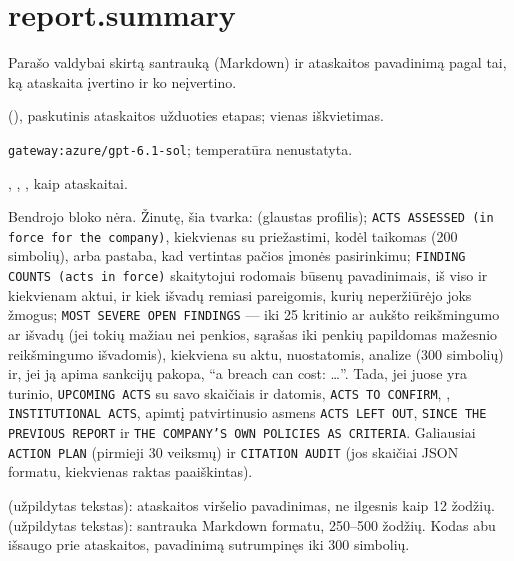 \section{report.summary}\label{sec:aprompts:report-summary}

 Parašo valdybai skirtą santrauką (Markdown) ir ataskaitos pavadinimą
pagal tai, ką ataskaita įvertino ir ko neįvertino.

  (), paskutinis
ataskaitos užduoties etapas; vienas iškvietimas.

 \texttt{gateway:azure/gpt-6.1-sol}; temperatūra
nenustatyta.

 , , , kaip
ataskaitai.

 Bendrojo bloko nėra. Žinutę, šia tvarka: 
(glaustas profilis); \texttt{ACTS ASSESSED (in force for the company)}, kiekvienas su
priežastimi, kodėl taikomas (200 simbolių), arba pastaba, kad vertintas pačios įmonės
pasirinkimu; \texttt{FINDING COUNTS (acts in force)} skaitytojui rodomais būsenų pavadinimais,
iš viso ir kiekvienam aktui, ir kiek išvadų remiasi pareigomis, kurių neperžiūrėjo joks žmogus;
\texttt{MOST SEVERE OPEN FINDINGS} --- iki 25 kritinio ar aukšto reikšmingumo  ar
 išvadų (jei tokių mažiau nei penkios, sąrašas iki penkių papildomas mažesnio
reikšmingumo išvadomis), kiekviena su aktu,
nuostatomis, analize (300 simbolių) ir, jei ją apima sankcijų pakopa, \enquote{a breach can
cost: …}. Tada, jei juose yra turinio, \texttt{UPCOMING ACTS} su savo skaičiais ir datomis,
\texttt{ACTS TO CONFIRM}, , \texttt{INSTITUTIONAL ACTS}, apimtį patvirtinusio
asmens \texttt{ACTS LEFT OUT}, \texttt{SINCE THE PREVIOUS REPORT} ir \texttt{THE COMPANY'S OWN POLICIES AS CRITERIA}. Galiausiai \texttt{ACTION PLAN} (pirmieji 30 veiksmų) ir
\texttt{CITATION AUDIT} (jos skaičiai JSON formatu, kiekvienas raktas paaiškintas).

  (užpildytas tekstas): ataskaitos viršelio
pavadinimas, ne ilgesnis kaip 12 žodžių.  (užpildytas tekstas): santrauka Markdown
formatu, 250--500 žodžių.
Kodas abu išsaugo prie ataskaitos, pavadinimą sutrumpinęs iki 300 simbolių.

